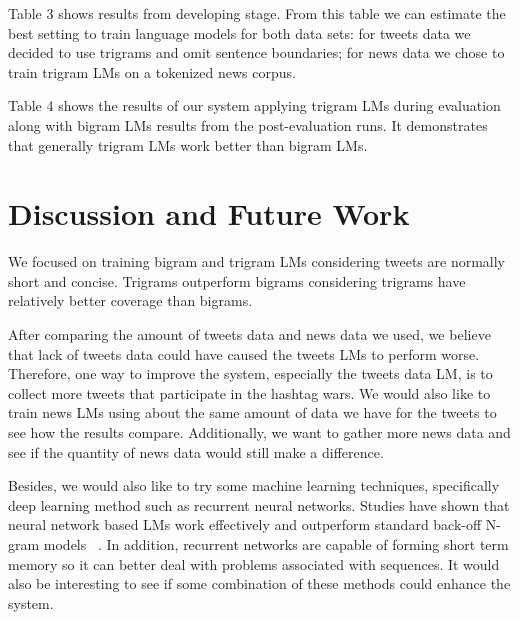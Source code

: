 \documentclass[11pt,a4paper]{article}
\begin{document}
Table 3 shows results from developing stage. From this table we can estimate the best setting to train language models for both data sets: for tweets data we decided to use trigrams and omit sentence boundaries; for news data we chose to train trigram LMs on a tokenized news corpus.

Table 4 shows the results of our system applying trigram LMs during evaluation along with bigram LMs results from the post-evaluation runs. It demonstrates that generally trigram LMs work better than bigram LMs.


\section{Discussion and Future Work}
We focused on training bigram and trigram LMs considering tweets are normally short and concise. Trigrams outperform bigrams considering trigrams have relatively better coverage than bigrams. 

After comparing the amount of tweets data and news data we used, we believe that lack of tweets data could have caused the tweets LMs to perform worse. Therefore, one way to improve the system, especially the tweets data LM, is to collect more tweets that participate in the hashtag wars. We would also like to train news LMs using about the same amount of data we have for the tweets to see how the results compare. Additionally, we want to gather more news data and see if the quantity of news data would still make a difference. 

Besides, we would also like to try some machine learning techniques, specifically deep learning method such as recurrent neural networks. Studies have shown that neural network based LMs work effectively and outperform standard back-off N-gram models ~\cite{mikolov2011extensions}. In addition, recurrent networks are capable of forming short term memory so it can better deal with problems associated with sequences. It would also be interesting to see if some combination of these methods could enhance the system.




%
%


\end{document}
